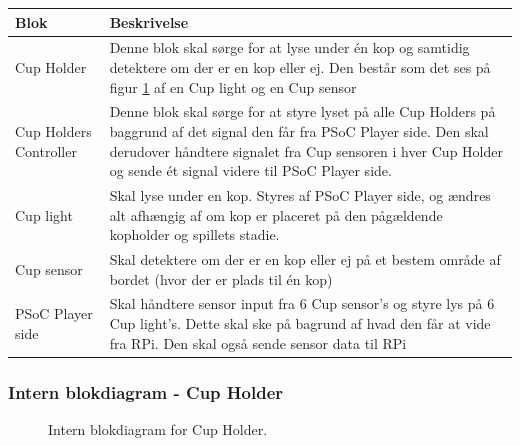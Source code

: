 \documentclass[Arkitektur/System_main.tex]{subfiles}
\begin{document}
\begin{table}[H]
\begin{tabular}{L{0.2\columnwidth}|L{0.8\columnwidth}}
\hline
\textbf{Blok} & \textbf{Beskrivelse} \\ \hline
Cup Holder & Denne blok skal sørge for at lyse under én kop og samtidig detektere om der er en kop eller ej. Den består som det ses på figur \ref{fig:playerside_hardware_bdd} af en Cup light og en Cup sensor \\ \hline
Cup Holders Controller & Denne blok skal sørge for at styre lyset på alle Cup Holders på baggrund af det signal den får fra PSoC Player side. Den skal derudover håndtere signalet fra Cup sensoren i hver Cup Holder og sende ét signal videre til PSoC Player side. \\ \hline
Cup light & Skal lyse under en kop. Styres af PSoC Player side, og ændres alt afhængig af om kop er placeret på den pågældende kopholder og spillets stadie.\\ \hline
Cup sensor & Skal detektere om der er en kop eller ej på et bestem område af bordet (hvor der er plads til én kop)\\ \hline
PSoC Player side & Skal håndtere sensor input fra 6 Cup sensor's og styre lys på 6 Cup light's. Dette skal ske på bagrund af hvad den får at vide fra RPi. Den skal også sende sensor data til RPi\\ \hline
\end{tabular}
\end{table}

\subsubsection{Intern blokdiagram - Cup Holder}
\begin{figure}[H]
    \centering
    \caption{Intern blokdiagram for Cup Holder.}
    \label{fig:playerside_hardware_bdd}
\end{figure}
\end{document}
